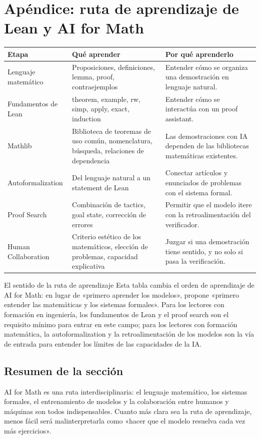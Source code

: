 \section{Apéndice: ruta de aprendizaje de Lean y AI for Math}

\noindent\begin{longtable}{p{}p{}p{}}
\toprule
Etapa & Qué aprender & Por qué aprenderlo \\
\midrule
Lenguaje matemático & Proposiciones, definiciones, lemma, proof, contraejemplos & Entender cómo se organiza una demostración en lenguaje natural. \\
Fundamentos de Lean & theorem, example, rw, simp, apply, exact, induction & Entender cómo se interactúa con un proof assistant. \\
Mathlib & Biblioteca de teoremas de uso común, nomenclatura, búsqueda, relaciones de dependencia & Las demostraciones con IA dependen de las bibliotecas matemáticas existentes. \\
Autoformalization & Del lenguaje natural a un statement de Lean & Conectar artículos y enunciados de problemas con el sistema formal. \\
Proof Search & Combinación de tactics, goal state, corrección de errores & Permitir que el modelo itere con la retroalimentación del verificador. \\
Human Collaboration & Criterio estético de los matemáticos, elección de problemas, capacidad explicativa & Juzgar si una demostración tiene sentido, y no solo si pasa la verificación. \\
\bottomrule
\end{longtable}

\begin{knowledgebox}{El sentido de la ruta de aprendizaje}
Esta tabla cambia el orden de aprendizaje de AI for Math: en lugar de «primero aprender los modelos», propone «primero entender las matemáticas y los sistemas formales». Para los lectores con formación en ingeniería, los fundamentos de Lean y el proof search son el requisito mínimo para entrar en este campo; para los lectores con formación matemática, la autoformalization y la retroalimentación de los modelos son la vía de entrada para entender los límites de las capacidades de la IA.
\end{knowledgebox}

\subsection{Resumen de la sección}

AI for Math es una ruta interdisciplinaria: el lenguaje matemático, los sistemas formales, el entrenamiento de modelos y la colaboración entre humanos y máquinas son todos indispensables. Cuanto más clara sea la ruta de aprendizaje, menos fácil será malinterpretarla como «hacer que el modelo resuelva cada vez más ejercicios».
